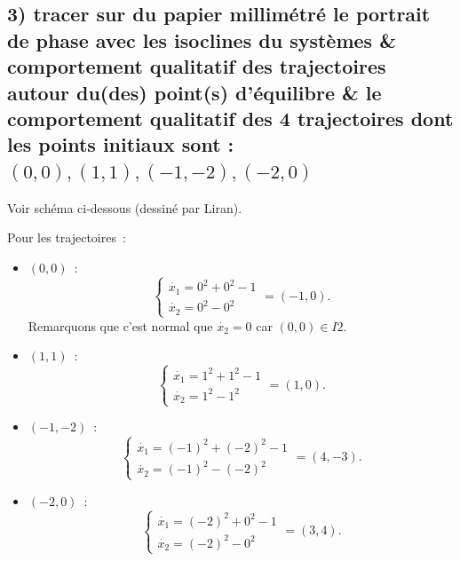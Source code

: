 \documentclass[11pt,a4paper]{report}
\begin{document}
		\subsection*{3) tracer sur du papier millimétré le portrait de phase avec les isoclines du systèmes \& comportement qualitatif des trajectoires autour du(des) point(s) d'équilibre \& le comportement
		qualitatif des 4 trajectoires dont les points initiaux sont : $(0,0) , (1,1), (-1, -2), (-2,0)$}

			Voir schéma ci-dessous (dessiné par Liran).

			Pour les trajectoires~:
			\begin{itemize}
				\item $(0,0)$~:
					\[
					\begin{cases}
						\dot{x_1} = 0^2 + 0^2 -1 \\
						\dot{x_2} = 0^2 - 0^2
					\end{cases}
					= (-1,0).
					\]
					Remarquons que c'est normal que $\dot {x_2} = 0$ car $(0,0) \in I2$.

				\item $(1,1)$~:
					\[
					\begin{cases}
						\dot{x_1} = 1^2 + 1^2 -1 \\
						\dot{x_2} = 1^2 - 1^2
					\end{cases}
					= (1,0).
					\]

				\item $(-1,-2)$~:
					\[
					\begin{cases}
						\dot{x_1} = (-1)^2 + (-2)^2 -1 \\
						\dot{x_2} = (-1)^2 - (-2)^2
					\end{cases}
					= (4, -3).
					\]

				\item $(-2,0)$~:
					\[
					\begin{cases}
						\dot{x_1} = (-2)^2 + 0^2 -1 \\
						\dot{x_2} = (-2)^2 - 0^2
					\end{cases}
					= (3, 4).
					\]
			\end{itemize}
\end{document}
